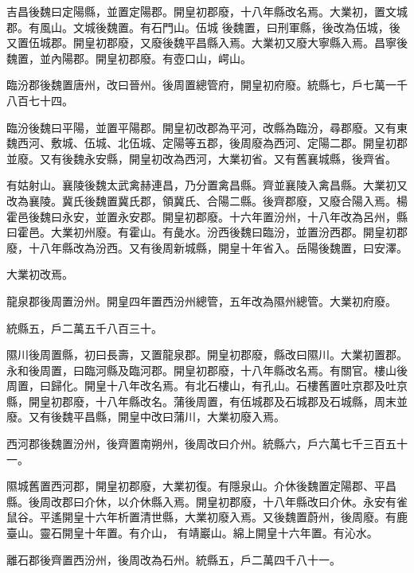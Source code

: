 \begin{pinyinscope}
 吉昌後魏曰定陽縣，並置定陽郡。開皇初郡廢，十八年縣改名焉。大業初，置文城郡。有風山。文城後魏置。有石門山。伍城
 後魏置，曰刑軍縣，後改為伍城，後又置伍城郡。開皇初郡廢，又廢後魏平昌縣入焉。大業初又廢大寧縣入焉。昌寧後魏置，並內陽郡。開皇初郡廢。有壺口山，崿山。



 臨汾郡後魏置唐州，改曰晉州。後周置總管府，開皇初府廢。統縣七，戶七萬一千八百七十四。



 臨汾後魏曰平陽，並置平陽郡。開皇初改郡為平河，改縣為臨汾，尋郡廢。又有東魏西河、敷城、伍城、北伍城、定陽等五郡，後周廢為西河、定陽二郡。開皇初郡並廢。又有後魏永安縣，開皇初改為西河，大業初省。又有舊襄城縣，後齊省。



 有姑射山。襄陵後魏太武禽赫連昌，乃分置禽昌縣。齊並襄陵入禽昌縣。大業初又改為襄陵。冀氏後魏置冀氏郡，領冀氏、合陽二縣。後齊郡廢，又廢合陽入焉。楊霍邑後魏曰永安，並置永安郡。開皇初郡廢。十六年置汾州，十八年改為呂州，縣曰霍邑。大業初州廢。有霍山。有彘水。汾西後魏曰臨汾，並置汾西郡。開皇初郡廢，十八年縣改為汾西。又有後周新城縣，開皇十年省入。岳陽後魏置，曰安澤。



 大業初改焉。



 龍泉郡後周置汾州。開皇四年置西汾州總管，五年改為隰州總管。大業初府廢。



 統縣五，戶二萬五千八百三十。



 隰川後周置縣，初曰長壽，又置龍泉郡。開皇初郡廢，縣改曰隰川。大業初置郡。永和後周置，曰臨河縣及臨河郡。開皇初郡廢，十八年縣改名焉。有關官。樓山後周置，曰歸化。開皇十八年改名焉。有北石樓山，有孔山。石樓舊置吐京郡及吐京縣，開皇初郡廢，十八年縣改名。蒲後周置，有伍城郡及石城郡及石城縣，周末並廢。又有後魏平昌縣，開皇中改曰蒲川，大業初廢入焉。



 西河郡後魏置汾州，後齊置南朔州，後周改曰介州。統縣六，戶六萬七千三百五十一。



 隰城舊置西河郡，開皇初郡廢，大業初復。有隱泉山。介休後魏置定陽郡、平昌縣。後周改郡曰介休，以介休縣入焉。開皇初郡廢，十八年縣改曰介休。永安有雀鼠谷。平遙開皇十六年析置清世縣，大業初廢入焉。又後魏置蔚州，後周廢。有鹿臺山。靈石開皇十年置。有介山，
 有靖巖山。綿上開皇十六年置。有沁水。



 離石郡後齊置西汾州，後周改為石州。統縣五，戶二萬四千八十一。




\end{pinyinscope}
